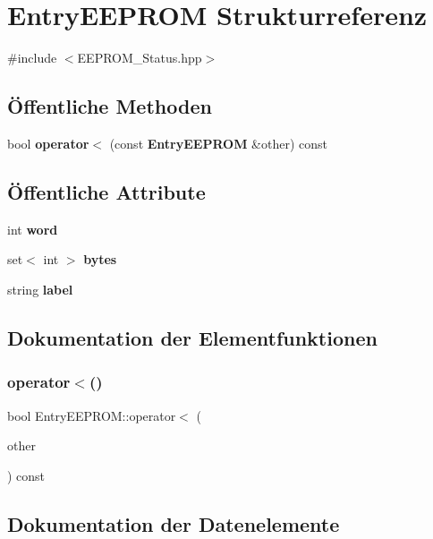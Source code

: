 \section{Entry\+E\+E\+P\+R\+OM Strukturreferenz}
\label{struct_entry_e_e_p_r_o_m}


{\ttfamily \#include $<$E\+E\+P\+R\+O\+M\+\_\+\+Status.\+hpp$>$}

\subsection*{Öffentliche Methoden}
\begin{DoxyCompactItemize}
\item 
bool \textbf{ operator$<$} (const \textbf{ Entry\+E\+E\+P\+R\+OM} \&other) const
\end{DoxyCompactItemize}
\subsection*{Öffentliche Attribute}
\begin{DoxyCompactItemize}
\item 
int \textbf{ word}
\item 
set$<$ int $>$ \textbf{ bytes}
\item 
string \textbf{ label}
\end{DoxyCompactItemize}


\subsection{Dokumentation der Elementfunktionen}
\mbox{\label{struct_entry_e_e_p_r_o_m_ad338c7f94d5ed103e07d6090395cf381}} 
\subsubsection{operator$<$()}
{\footnotesize\ttfamily bool Entry\+E\+E\+P\+R\+O\+M\+::operator$<$ (\begin{DoxyParamCaption}\item[{const \textbf{ Entry\+E\+E\+P\+R\+OM} \&}]{other }\end{DoxyParamCaption}) const\hspace{0.3cm}{\ttfamily [inline]}}



\subsection{Dokumentation der Datenelemente}
\mbox{\label{struct_entry_e_e_p_r_o_m_a5286fd447a14070a11278d2db28c122e}} 
